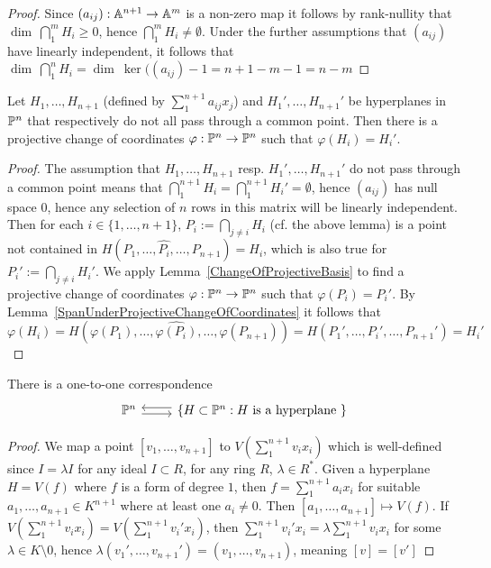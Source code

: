     \begin{proof}
        Since $(a_{ij}): \mathbb{A}^{n+1}\rightarrow \mathbb{A}^m$ is a non-zero map it follows by rank-nullity that $\dim\ \bigcap_1^m H_i \geq 0$, hence $\bigcap_1^m H_i\neq \emptyset$. Under the further assumptions that $(a_{ij})$ have linearly independent, it follows that $\dim \ \bigcap_1^n H_i = \dim \ \ker((a_{ij})-1=n+1-m-1=n-m $
    \end{proof}
    \begin{lemma}
        Let $H_1,\dots,H_{n+1}$ (defined by $\sum_1^{n+1} a_{ij}x_j$) and $H_1',\dots,H_{n+1}'$ be hyperplanes in $\mathbb{P}^n$ that respectively do not all pass through a common point. Then there is a projective change of coordinates $\varphi : \mathbb{P}^n \rightarrow \mathbb{P}^n$ such that $\varphi(H_i)=H_i'$.
    \end{lemma}
    \begin{proof}
        The assumption that $H_1,\dots,H_{n+1}$ resp. $H_1',\dots , H_{n+1}'$ do not pass through a common point means that $\bigcap_1^{n+1} H_i = \bigcap_1^{n+1} H_i' = \emptyset$, hence $(a_{ij})$ has null space $0$, hence any selection of $n$ rows in this matrix will be linearly independent. Then for each $i\in \{1,\dots,n+1\}$, $P_i:= \bigcap_{j\neq i} H_i$ (cf. the above lemma) is a point not contained in $H(P_1,\dots,\widehat{P_i},\dots,P_{n+1})=H_i$, which is also true for $P_i' := \bigcap_{j\neq i} H_i'$. We apply Lemma~\ref{ChangeOfProjectiveBasis} to find a projective change of coordinates $\varphi: \mathbb{P}^n \rightarrow \mathbb{P}^n$ such that $\varphi(P_i) = P_i'$. By Lemma~\ref{SpanUnderProjectiveChangeOfCoordinates} it follows that 
        $$\varphi(H_i)=H(\varphi(P_1),\dots, \widehat{\varphi(P_i)},\dots, \varphi(P_{n+1}))=H(P_1',\dots,P_i',\dots,P_{n+1}')=H_i'$$
    \end{proof}
    \begin{proposition}
        There is a one-to-one correspondence
        $$\begin{tikzcd}
            \Pp^n \arrow[r,shift right]  & \left\{H\subset \Pp^n : H \text{ is a hyperplane }\right\} \arrow[l, shift right]
        \end{tikzcd}$$
    \end{proposition}
    \begin{proof}
        We map a point $[v_1,\dots,v_{n+1}]$ to $V\left(\sum_1^{n+1} v_ix_i\right)$ which is well-defined since $I=\lambda I$ for any ideal $I\subset R$, for any ring $R$, $\lambda \in R^\ast$. Given a hyperplane $H=V(f)$ where $f$ is a form of degree $1$, then $f=\sum_1^{n+1} a_ix_i$ for suitable $a_1,\dots,a_{n+1}\in K^{n+1}$ where at least one $a_i\neq 0$. Then $[a_1,\dots,a_{n+1}]\mapsto V(f)$. If $V\left(\sum_1^{n+1} v_ix_i\right)=V\left(\sum_1^{n+1} v_i'x_i\right)$, then $\sum_1^{n+1} v_i'x_i = \lambda \sum_1^{n+1} v_ix_i$ for some $\lambda \in K\setminus 0$, hence $\lambda ( v_1',\dots,v_{n+1}') = (v_1,\dots,v_{n+1})$, meaning $[v]=[v']$  
    \end{proof}
